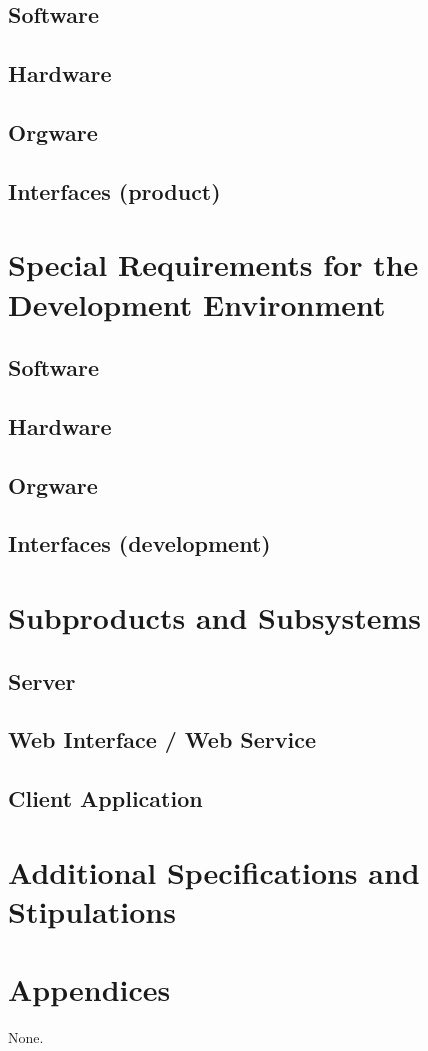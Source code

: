 \documentclass[11pt,a4paper,oneside,svgnames,draft]{report}
\begin{document}
\section{Software}
\section{Hardware}
\section{Orgware}
\section{Interfaces (product)}

\chapter{Special Requirements for the Development Environment}
\section{Software}
\section{Hardware}
\section{Orgware}
\section{Interfaces (development)}

\chapter{Subproducts and Subsystems}
\section{Server}
\section{Web Interface / Web Service}
\section{Client Application}

\chapter{Additional Specifications and Stipulations}
\chapter{Appendices}
None.
\end{document}
